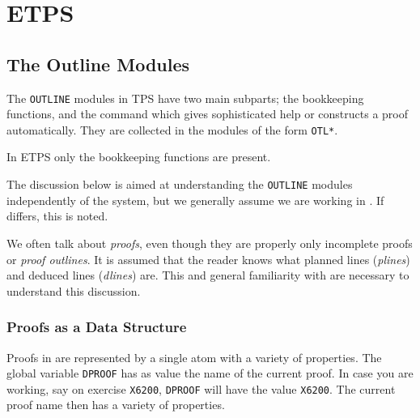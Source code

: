\chapter{ETPS}\label{etps}

\section{The Outline Modules}

The {\tt OUTLINE} modules in TPS have two main subparts; 
the bookkeeping functions, and the  command which
gives sophisticated help or constructs a proof automatically.
They are collected in the modules of the form {\tt OTL*}.

In ETPS only the bookkeeping functions are present.

The discussion below is aimed at understanding the {\tt OUTLINE} modules
independently of the system, but we generally assume we are working in
\ETPS.  If \TPS differs, this is noted.

We often talk about {\it proofs}, even though they are properly only incomplete
proofs or {\it proof outlines}.  It is assumed that the reader knows what
planned lines ({\it plines}) and deduced lines ({\it dlines}) are.  This and 
general familiarity with \ETPS are necessary to understand this discussion.

\subsection{Proofs as a Data Structure}

Proofs in \ETPS are represented by a single atom with a variety of properties.
The global variable {\tt DPROOF} has as value the name of the current proof.
In case you are working, say on exercise {\tt X6200}, {\tt DPROOF} will have the 
value {\tt X6200}.  The current proof name then has a variety of properties.


